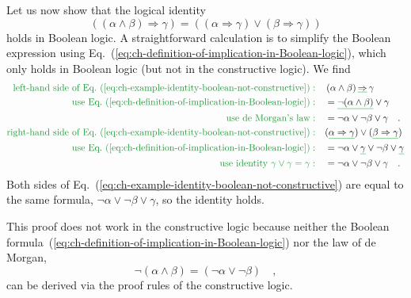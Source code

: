 Let us now show that the logical identity 
\begin{equation}
((\alpha\wedge\beta)\Rightarrow\gamma)=((\alpha\Rightarrow\gamma)\vee(\beta\Rightarrow\gamma))\label{eq:ch-example-identity-boolean-not-constructive}
\end{equation}
holds in Boolean logic. A straightforward calculation is to simplify
the Boolean expression using Eq.~(\ref{eq:ch-definition-of-implication-in-Boolean-logic}),
which only holds in Boolean logic (but not in the constructive logic).
We find
\begin{align*}
{\color{greenunder}\text{left-hand side of Eq.~(\ref{eq:ch-example-identity-boolean-not-constructive})}:}\quad & \left(\alpha\wedge\beta\right)\gunderline{\Rightarrow}\,\gamma\\
{\color{greenunder}\text{use Eq.~(\ref{eq:ch-definition-of-implication-in-Boolean-logic})}:}\quad & =\gunderline{\neg(\alpha\wedge\beta)}\vee\gamma\\
{\color{greenunder}\text{use de Morgan's law}:}\quad & =\neg\alpha\vee\neg\beta\vee\gamma\quad.\\
{\color{greenunder}\text{right-hand side of Eq.~(\ref{eq:ch-example-identity-boolean-not-constructive})}:}\quad & (\gunderline{\alpha\Rightarrow\gamma})\vee(\gunderline{\beta\Rightarrow\gamma})\\
{\color{greenunder}\text{use Eq.~(\ref{eq:ch-definition-of-implication-in-Boolean-logic})}:}\quad & =\neg\alpha\vee\gunderline{\gamma}\vee\neg\beta\vee\gunderline{\gamma}\\
{\color{greenunder}\text{use identity }\gamma\vee\gamma=\gamma:}\quad & =\neg\alpha\vee\neg\beta\vee\gamma\quad.
\end{align*}
Both sides of Eq.~(\ref{eq:ch-example-identity-boolean-not-constructive})
are equal to the same formula, $\neg\alpha\vee\neg\beta\vee\gamma$,
so the identity holds.

This proof does not work in the constructive logic because neither
the Boolean formula~(\ref{eq:ch-definition-of-implication-in-Boolean-logic})
nor the law of de Morgan,
\[
\neg(\alpha\wedge\beta)=\left(\neg\alpha\vee\neg\beta\right)\quad,
\]
can be derived via the proof rules of the constructive logic.

